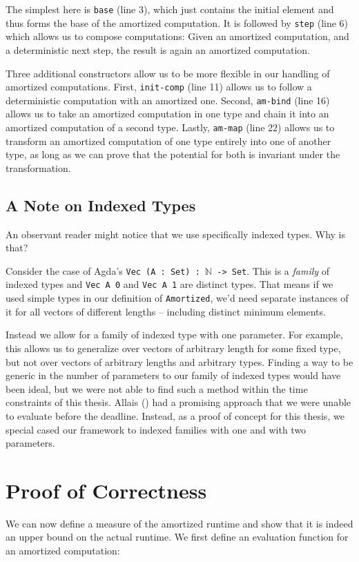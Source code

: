 The simplest here is \texttt{base} (line 3), which just contains the initial element and thus forms the base of the amortized computation. It is followed by \texttt{step} (line 6) which allows us to compose computations: Given an amortized computation, and a deterministic next step, the result is again an amortized computation.

Three additional constructors allow us to be more flexible in our handling of amortized computations. First, \texttt{init-comp} (line 11) allows us to follow a deterministic computation with an amortized one. Second, \texttt{am-bind} (line 16) allows us to take an amortized computation in one type and chain it into an amortized computation of a second type. Lastly, \texttt{am-map} (line 22) allows us to transform an amortized computation of one type entirely into one of another type, as long as we can prove that the potential for both is invariant under the transformation.

\subsection{A Note on Indexed Types}
An observant reader might notice that we use specifically indexed types. Why is that?

Consider the case of Agda's \texttt{Vec (A : Set) : $\mathbb N$ -> Set}. This is a \emph{family} of indexed types and \texttt{Vec A 0} and \texttt{Vec A 1} are distinct types. That means if we used simple types in our definition of \texttt{Amortized}, we'd need separate instances of it for all vectors of different lengths -- including distinct minimum elements.

Instead we allow for a family of indexed type with one parameter. For example, this allows us to generalize over vectors of arbitrary length for some fixed type, but not over vectors of arbitrary lengths and arbitrary types. Finding a way to be generic in the number of parameters to our family of indexed types would have been ideal, but we were not able to find such a method within the time constraints of this thesis. Allais (\cite{allais:2019:polymorphic-nary-functions}) had a promising approach that we were unable to evaluate before the deadline. Instead, as a proof of concept for this thesis, we special cased our framework to indexed families with one and with two parameters.

\section{Proof of Correctness}
We can now define a measure of the amortized runtime and show that it is indeed an upper bound on the actual runtime. We first define an evaluation function for an amortized computation:

